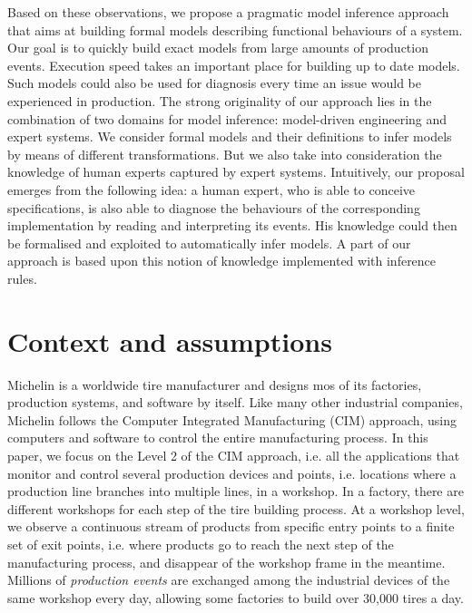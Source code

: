 Based on these observations, we propose a pragmatic model
inference approach that aims at building formal models describing
functional behaviours of a system. Our goal is to quickly build
exact models from large amounts of production events.  Execution
speed takes an important place for building up to date models.
Such models could also be used for diagnosis every time an issue
would be experienced in production. The strong originality of our
approach lies in the combination of two domains for model
inference: model-driven engineering and expert systems. We
consider formal models and their definitions to infer models by
means of different transformations. But we also take into
consideration the knowledge of human experts captured by expert
systems.  Intuitively, our proposal emerges from the following
idea: a human expert, who is able to conceive specifications, is
also able to diagnose the behaviours of the corresponding
implementation by reading and interpreting its events. His
knowledge could then be formalised and exploited to automatically
infer models.  A part of our approach is based upon this notion
of knowledge implemented with inference rules.


\section{Context and assumptions}
\label{sec:modelinf:prodsystems:context}

Michelin is a worldwide tire manufacturer and designs mos of its
factories, production systems, and software by itself.  Like
many other industrial companies, Michelin follows the Computer
Integrated Manufacturing (CIM) approach, using computers and
software to control the entire manufacturing process. In this
paper, we focus on the Level 2 of the CIM approach, i.e. all the
applications that monitor and control several production devices
and points, i.e. locations where a production line branches into
multiple lines, in a workshop. In a factory, there are different
workshops for each step of the tire building process. At a
workshop level, we observe a continuous stream of products from
specific entry points to a finite set of exit points, i.e. where
products go to reach the next step of the manufacturing process,
and disappear of the workshop frame in the meantime. Millions of
\emph{production events} are exchanged among the industrial
devices of the same workshop every day, allowing some factories
to build over 30,000 tires a day.

